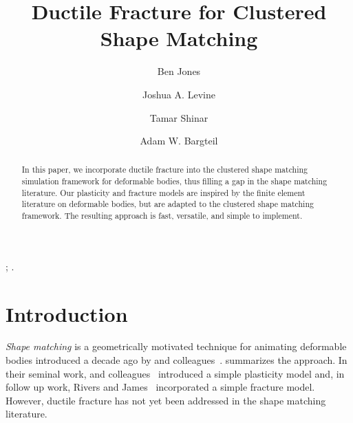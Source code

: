 \documentclass[review]{acmsiggraph}
\title{Ductile Fracture for Clustered Shape Matching}
\author[*]{Ben Jones}
\author[**]{Joshua A. Levine}
\author[***]{Tamar Shinar}
\author[*]{Adam W. Bargteil}
\affil[*]{University of Utah}
\affil[**]{Clemson University}
\affil[***]{University of California, Riverside}
\begin{document}


\maketitle

\begin{abstract}
In this paper, we incorporate ductile fracture into the clustered shape matching simulation framework
for deformable bodies, thus filling a gap in the shape matching literature.  
Our plasticity and fracture models are inspired by the finite element literature on deformable bodies, 
but are adapted to the clustered shape matching framework.
The resulting approach is fast, versatile, and simple to implement.
\end{abstract}

\begin{CRcatlist}
  ;
  .
\end{CRcatlist}

\keywordlist


\copyrightspace

\section{Introduction}\label{sec:Introduction}
{\em Shape matching} is a geometrically motivated technique for animating deformable bodies introduced
a decade ago by \Mueller and colleagues~.
 summarizes the approach.
In their seminal work, \Mueller and colleagues~ introduced a simple plasticity
model and, in follow up work, Rivers and James~
incorporated a simple fracture model.  However, ductile fracture has not yet been addressed in the
shape matching literature.
\end{document}

